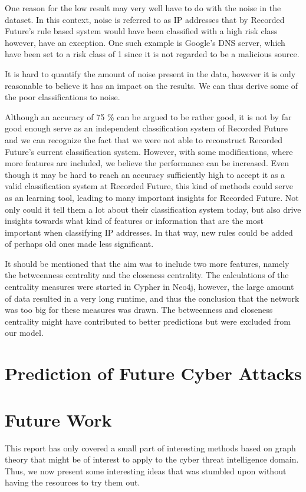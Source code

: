 One reason for the low result may very well have to do with the noise in the dataset. In this context, noise is referred to as IP addresses that by Recorded Future's rule based system would have been classified with a high risk class however, have an exception. One such example is Google's DNS server, which have been set to a risk class of 1 since it is not regarded to be a malicious source. 

It is hard to quantify the amount of noise present in the data, however it is only reasonable to believe it has an impact on the results. We can thus derive some of the poor classifications to noise. 

Although an accuracy of 75 \% can be argued to be rather good, it is not by far good enough serve as an independent classification system of Recorded Future and we can recognize the fact that we were not able to reconstruct Recorded Future's current classification system. However, with some modifications, where more features are included, we believe the performance can be increased. Even though it may be hard to reach an accuracy sufficiently high to accept it as a valid classification system at Recorded Future, this kind of methods could serve as an learning tool, leading to many important insights for Recorded Future. Not only could it tell them a lot about their classification system today, but also drive insights towards what kind of features or information that are the most important when classifying IP addresses. In that way, new rules could be added of perhaps old ones made less significant. 

It should be mentioned that the aim was to include two more features, namely the betweenness centrality and the closeness centrality. The calculations of the centrality measures were started in Cypher in Neo4j, however, the large amount of data resulted in a very long runtime, and thus the conclusion that the network was too big for these measures was drawn. The betweenness and closeness centrality might have contributed to better predictions but were excluded from our model.

\section{Prediction of Future Cyber Attacks}


\section{Future Work}
This report has only covered a small part of interesting methods based on graph theory that might be of interest to apply to the cyber threat intelligence domain. Thus, we now present some interesting ideas that was stumbled upon without having the resources to try them out. 


